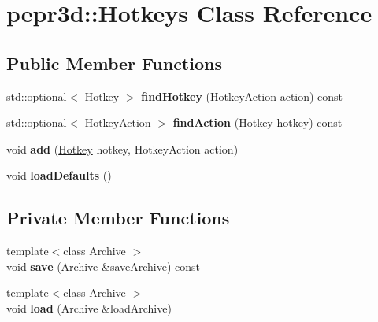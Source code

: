 \hypertarget{classpepr3d_1_1_hotkeys}{}\section{pepr3d\+::Hotkeys Class Reference}
\label{classpepr3d_1_1_hotkeys}
\subsection*{Public Member Functions}
\begin{DoxyCompactItemize}
\item 
\mbox{\label{classpepr3d_1_1_hotkeys_af57c6eb43b445e2f94f5777c216186d7}} 
std\+::optional$<$ \mbox{\hyperlink{structpepr3d_1_1_hotkey}{Hotkey}} $>$ {\bfseries find\+Hotkey} (Hotkey\+Action action) const
\item 
\mbox{\label{classpepr3d_1_1_hotkeys_ade71a2e93bb0ad6f9e5fe9898be16cf5}} 
std\+::optional$<$ Hotkey\+Action $>$ {\bfseries find\+Action} (\mbox{\hyperlink{structpepr3d_1_1_hotkey}{Hotkey}} hotkey) const
\item 
\mbox{\label{classpepr3d_1_1_hotkeys_a841a7666ac1997ef11756d284e427dfd}} 
void {\bfseries add} (\mbox{\hyperlink{structpepr3d_1_1_hotkey}{Hotkey}} hotkey, Hotkey\+Action action)
\item 
\mbox{\label{classpepr3d_1_1_hotkeys_ab708b1e552b5adc73e05aa4284c0651c}} 
void {\bfseries load\+Defaults} ()
\end{DoxyCompactItemize}
\subsection*{Private Member Functions}
\begin{DoxyCompactItemize}
\item 
\mbox{\label{classpepr3d_1_1_hotkeys_a09f080ad99f8f9b74f32be2758ff6680}} 
{\footnotesize template$<$class Archive $>$ }\\void {\bfseries save} (Archive \&save\+Archive) const
\item 
\mbox{\label{classpepr3d_1_1_hotkeys_a2f2a9f76a541573fe059f24bca1ace54}} 
{\footnotesize template$<$class Archive $>$ }\\void {\bfseries load} (Archive \&load\+Archive)
\end{DoxyCompactItemize}
